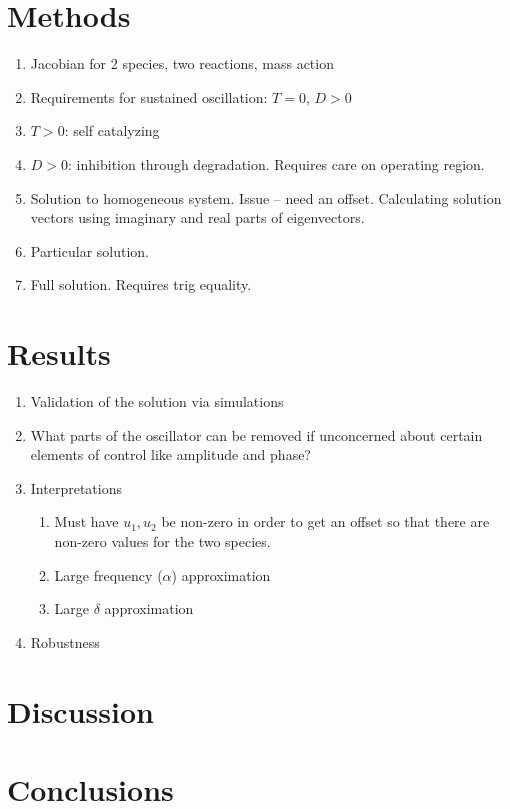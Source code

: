 \documentclass{bmcart}
\begin{document}
\section*{Methods}
\begin{enumerate}
    \item Jacobian for 2 species, two reactions, mass action
    \item Requirements for sustained oscillation: $T = 0$, $D > 0$
    \item $T> 0$: self catalyzing
    \item $D > 0$: inhibition through degradation. Requires care on operating region.
    \item Solution to homogeneous system. Issue -- need an offset. Calculating solution vectors using imaginary and real parts of eigenvectors.
    \item Particular solution.
    \item Full solution. Requires trig equality.
\end{enumerate}


\section*{Results}
\begin{enumerate}
    \item Validation of the solution via simulations
    \item What parts of the oscillator can be removed if unconcerned about certain elements of control like amplitude and phase?
    \item Interpretations
    \begin{enumerate}
        \item Must have $u_1, u_2$ be non-zero in order to get an offset so that there are non-zero values for the two species.
        \item Large frequency ($\alpha$) approximation
        \item Large $\delta$ approximation
    \end{enumerate}
    \item Robustness
\end{enumerate}


\section*{Discussion}


\section*{Conclusions}
\end{document}
